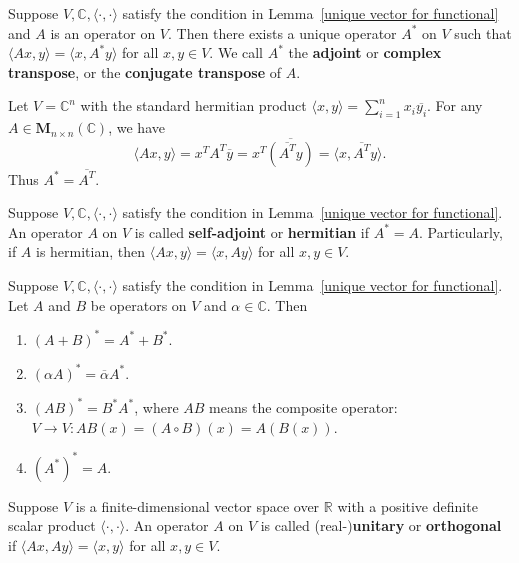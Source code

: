 \documentclass{ctexart}
\newcommand{\M}{\mathbf{M}}
\newcommand{\R}{\mathbb{R}}
\newcommand{\C}{\mathbb{C}}
\begin{document}
    \begin{mythm}
        Suppose $V, \C, \langle \cdot, \cdot \rangle$ satisfy the condition in Lemma~\ref{unique vector for functional} and $A$ is an operator on $V$. Then there exists a unique operator $A^*$ on $V$ such that $\langle A x, y \rangle = \langle x, A^* y \rangle$ for all $x,y \in V$. We call $A^*$ the \textbf{adjoint} or \textbf{complex transpose}, or the \textbf{conjugate transpose} of $A$.
    \end{mythm}
    \begin{myex}
        Let $V = \C^n$ with the standard hermitian product $\langle x, y \rangle = \displaystyle \sum_{i=1}^n x_i \overline{y_i}$. For any $A \in \M_{n \times n}(\C)$, we have $$\langle A x, y \rangle = x^T A^T \overline{y} = x^T \overline{ \left( \overline{A^T} y \right) } = \langle x, \overline{A^T} y \rangle.$$ Thus $A^* = \overline{A^T}$.
    \end{myex}
    \begin{mydef}
        Suppose $V, \C, \langle \cdot, \cdot \rangle$ satisfy the condition in Lemma~\ref{unique vector for functional}. An operator $A$ on $V$ is called \textbf{self-adjoint} or \textbf{hermitian} if $A^* = A$. Particularly, if $A$ is hermitian, then $\langle A x, y \rangle = \langle x, A y \rangle$ for all $x,y \in V$.
    \end{mydef}
    \begin{mythm}
        Suppose $V, \C, \langle \cdot, \cdot \rangle$ satisfy the condition in Lemma~\ref{unique vector for functional}. Let $A$ and $B$ be operators on $V$ and $\alpha \in \C$. Then
        \begin{enumerate}
            \item $(A+B)^* = A^* + B^*$.
            \item $(\alpha A)^* = \overline{\alpha} A^*$.
            \item $(AB)^* = B^* A^*$, where $AB$ means the composite operator: $V\to V: AB(x) = (A\circ B)(x) = A(B(x))$.
            \item $(A^*)^* = A$.
        \end{enumerate}
    \end{mythm}
    \begin{mydef}\label{def: unitary operator}
        Suppose $V$ is a finite-dimensional vector space over $\R$ with a positive definite scalar product $\langle \cdot, \cdot \rangle$. An operator $A$ on $V$ is called (real-)\textbf{unitary} or \textbf{orthogonal} if $\langle A x, A y \rangle = \langle x, y \rangle$ for all $x,y \in V$.
    \end{mydef}
\end{document}
